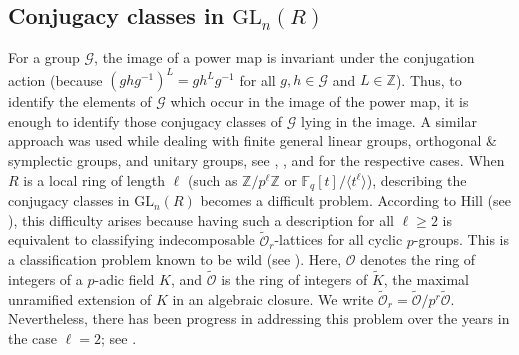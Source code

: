 \documentclass[11pt,twoside]{amsart}
\newcommand{\GL}{\mathrm{GL}}
\newcommand{\M}{\mathrm{M}}
\newcommand{\ext}{\mathrm{Ext}}
\newcommand{\Z}{\mathbb{Z}}
\newcommand{\R}{\mathscr{O}_2}
\newtheorem{lemma}{Lemma}[section]
\theoremstyle{definition} %
\begin{document}
\subsection{Conjugacy classes in $\GL_n(R)$} 

For a group $\mathscr G$, the image of a power map is invariant under the conjugation action (because $(ghg^{-1})^L = gh^Lg^{-1}$ for all $g, h\in\mathscr G$ and $L\in\Z$). Thus, to identify the elements of $\mathscr G$ which occur in the image of the power map, it is enough to identify those conjugacy classes of $\mathscr G$ lying in the image. A similar approach was used while dealing with finite general linear groups, orthogonal \& symplectic groups, and unitary groups, see \cite{KunduSinghGL}, \cite{PanjaSinghSymplectic25}, and \cite{PanjaSinghUnitary24} for the respective cases. When $R$ is a local ring of length $\ell$ (such as $\mathbb{Z}/p^\ell \mathbb{Z}$ or $\mathbb{F}_q[t]/\langle t^\ell\rangle$), describing the conjugacy classes in $\GL_n(R)$ becomes a difficult problem. According to Hill (see \cite{Hill95}), this difficulty arises because having such a description for all $\ell\geq 2$ is equivalent to classifying indecomposable $\widetilde{\mathscr{O}}_r$-lattices for all cyclic $p$-groups. This is a classification problem known to be wild (see \cite{GudivokPogorilyak89}). Here, $\mathscr{O}$ denotes the ring of integers of a $p$-adic field $K$, and $\widetilde{\mathscr{O}}$ is the ring of integers of $\widetilde{K}$, the maximal unramified extension of $K$ in an algebraic closure. We write $\widetilde{\mathscr{O}}_r = \widetilde{\mathscr{O}}/p^r \widetilde{\mathscr{O}}$. Nevertheless, there has been progress in addressing this problem over the years in the case $\ell = 2$; see \cite{Singla2010b, PrasadSinglaSpallone2015}. 


\end{document}
